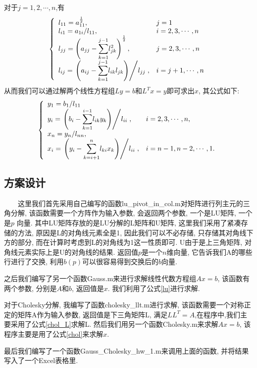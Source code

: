 \documentclass[a4paper]{article}
\begin{document}
\begin{CJK*}{GBK}{song}
对于$j=1,2,\cdots,n$,有 %
\begin{equation}\label{chol_L}
    \left\{
    \begin{array}{ll}
    l_{11}=a_{11}^{\frac{1}{2}}, & j=1 \\
    l_{i1}=a_{1i}/l_{11}, & i=2,3,\cdots,n \\
    l_{jj}=\left(a_{jj}-\displaystyle{\sum_{k=1}^{j-1}}l_{jk}^2\right)^{\frac{1}{2}}, & j=2,3,\cdots,n \ \\
    l_{ij}=\left. \left(a_{ij}-\displaystyle{\sum_{k=1}^{j-1}}l_{ik}l_{jk}\right)\middle/ l_{jj}\right., & i=j+1,\cdots ,n \\
    \end{array} \right.
\end{equation}
从而我们可以通过解两个线性方程组$Ly=b$和$L^Tx=y$即可求出$x$, 其公式如下:
\begin{equation}\label{chol}
    \left\{
    \begin{array}{ll}
    y_1=b_1/l_{11} & \\
    y_i=\left. \left(b_i-\displaystyle{\sum_{k=1}^{i-1}}l_{ik}y_k\right)\middle/ l_{ii} \right., & i=2,3,\cdots,n,\\
    x_n = y_n / l_{nn},& \\
    x_i=\left. \left(y_i-\displaystyle{\sum_{k=i+1}^{n}}l_{ki}x_k\right)\middle/ l_{ii}\right., & i=n-1,n-2,\cdots,1. \\
    \end{array} \right.
\end{equation}


\subsection{方案设计}

~~~~这里我们首先采用自己编写的函数lu\_pivot\_in\_col.m对矩阵进行列主元的三角分解, 该函数需要一个方阵作为输入参数, 会返回两个参数, 一个是LU矩阵, 一个是$p$ 向量. 其中LU矩阵存放的是LU分解的L矩阵和U矩阵, 这里我们采用了紧凑存储的方法, 原因是L的对角线元素全是1, 因此我们可以不必存储, 只存储其对角线下方的部分, 而在计算时考虑到L的对角线为1这一性质即可. U由于是上三角矩阵, 对角线元素实际上是U的对角线的结果. 返回值$p$是一个$n$维向量, 它告诉我们A的哪些行进行了交换, 利用$b(p)$可以很容易得到交换后的$b$向量.\par
之后我们编写了另一个函数Gauss.m来进行求解线性代数方程组$Ax=b$, 该函数有两个参数, 分别是$A$和$b$, 返回值是$x$. 我们利用了公式\eqref{lu}进行求解.\par
对于Cholesky分解, 我编写了函数cholesky\_llt.m进行求解, 该函数需要一个对称正定的矩阵A作为输入参数, 返回值是下三角矩阵L, 满足$LL^T=A$,在程序中,我们主要采用了公式\eqref{chol_L}求解L. 然后我们用另一个函数Cholesky.m来求解$Ax=b$, 该程序主要是用了公式\eqref{chol}来求解$x$.\par
最后我们编写了一个函数Gauss\_Cholesky\_hw\_1.m来调用上面的函数, 并将结果写入了一个Excel表格里.

\end{CJK*}
\end{document}
